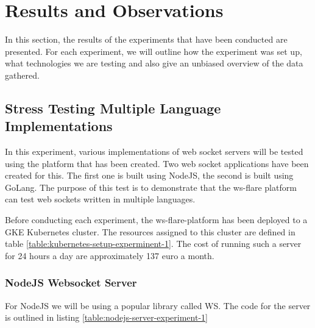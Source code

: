 \chapter{Results and Observations}

In this section, the results of the experiments that have been conducted are presented. For each experiment, we will outline how the experiment was set up, what technologies we are testing and also give an unbiased overview of the data gathered.

\section{Stress Testing Multiple Language Implementations}

In this experiment, various implementations of web socket servers will be tested using the platform that has been created. Two web socket applications have been created for this. The first one is built using NodeJS, the second is built using GoLang. The purpose of this test is to demonstrate that the ws-flare platform can test web sockets written in multiple languages.

Before conducting each experiment, the ws-flare-platform has been deployed to a GKE Kubernetes cluster. The resources assigned to this cluster are defined in table \ref{table:kubernetes-setup-experminent-1}. The cost of running such a server for 24 hours a day are approximately 137 euro a month.

\begin{table}[H]
\caption{Kubernetes Setup}
\label{table:kubernetes-setup-experminent-1}
\end{table}

\subsection{NodeJS Websocket Server}

For NodeJS we will be using a popular library called WS. The code for the server is outlined in listing \ref{table:nodejs-server-experiment-1}

